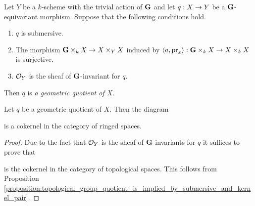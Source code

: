 \begin{definition}
Let $Y$ be a $k$-scheme with the trivial action of $\mathbf{G}$ and let $q:X\rightarrow Y$ be a $\mathbf{G}$-equivariant morphism. Suppose that the following conditions hold.
\begin{enumerate}[label=\textbf{(\arabic*)}, leftmargin=3.0em]
\item $q$ is submersive.
\item The morphism $\mathbf{G}\times_kX\rightarrow X\times_YX$ induced by $\langle a, \mathrm{pr}_x\rangle:\mathbf{G}\times_kX \rightarrow X\times_kX$ is surjective.
\item ${\mathcal O}_Y$ is the sheaf of $\mathbf{G}$-invariant for $q$.
\end{enumerate}
Then $q$ is \textit{a geometric quotient of $X$}.
\end{definition}

\begin{corollary}\label{corollary:geometric_quotient_is_ringed_space_quotient}
Let $q$ be a geometric quotient of $X$. Then the diagram
\begin{center}
\end{center}
is a cokernel in the category of ringed spaces.
\end{corollary}
\begin{proof}
Due to the fact that ${\mathcal O}_Y$ is the sheaf of $\mathbf{G}$-invariants for $q$ it suffices to prove that
\begin{center}
\end{center}
is the cokernel in the category of topological spaces. This follows from Proposition \ref{proposition:topological_group_quotient_is_implied_by_submersive_and_kernel_pair}.
\end{proof}

